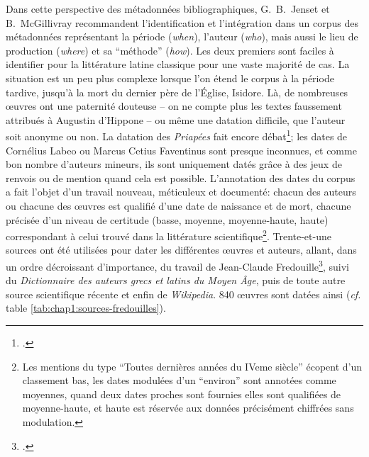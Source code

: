 Dans cette perspective des métadonnées bibliographiques, G.~B.~Jenset et B.~McGillivray recommandent l'identification et l'intégration dans un corpus des métadonnées représentant la période (\textit{when}), l'auteur (\textit{who}), mais aussi le lieu de production (\textit{where}) et sa \enquote{méthode} (\textit{how}). 
Les deux premiers sont faciles à identifier pour la littérature latine classique pour une vaste majorité de cas. La situation est un peu plus complexe lorsque l'on étend le corpus à la période tardive, jusqu'à la mort du dernier père de l'Église, Isidore. Là, de nombreuses œuvres ont une paternité douteuse -- on ne compte plus les textes faussement attribués à Augustin d'Hippone -- ou même une datation difficile, que l'auteur soit anonyme ou non. La datation des \textit{Priapées} fait encore débat\footcite{oconnor_carminis_2019}; les dates de Cornélius Labeo ou Marcus Cetius Faventinus sont presque inconnues, et comme bon nombre d'auteurs mineurs, ils sont uniquement datés grâce à des jeux de renvois ou de mention quand cela est possible. L'annotation des dates du corpus a fait l'objet d'un travail nouveau, méticuleux et documenté: chacun des auteurs ou chacune des œuvres est qualifié d'une date de naissance et de mort, chacune précisée d'un niveau de certitude (basse, moyenne, moyenne-haute, haute) correspondant à celui trouvé dans la littérature scientifique\footnote{Les mentions du type \enquote{Toutes dernières années du IVeme siècle} écopent d'un classement bas, les dates modulées d'un \enquote{environ} sont annotées comme moyennes, quand deux dates proches sont fournies elles sont qualifiées de moyenne-haute, et haute est réservée aux données précisément chiffrées sans modulation.}. Trente-et-une sources ont été utilisées pour dater les différentes œuvres et auteurs, allant, dans un ordre décroissant d'importance, du travail de Jean-Claude Fredouille\footcite{fredouille}, suivi du \textit{Dictionnaire des auteurs grecs et latins du Moyen Âge}\cite{buchwald_dictionnaire_1991}, puis de toute autre source scientifique récente et enfin de \textit{Wikipedia}. 840 œuvres sont datées ainsi (\textit{cf.} table \ref{tab:chap1:sources-fredouilles}).


